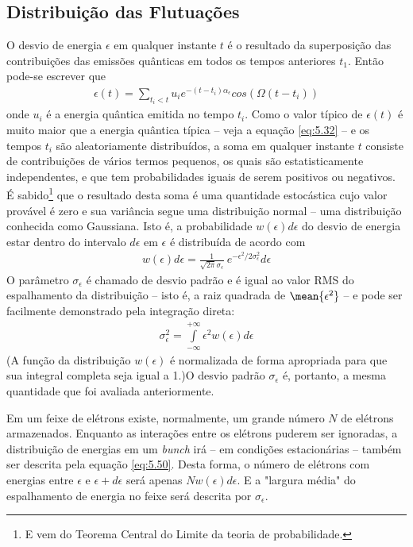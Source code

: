 \subsection{Distribuição das Flutuações}
O desvio de energia $\epsilon$ em qualquer instante $t$ é o resultado da superposição das contribuições das emissões quânticas em todos os tempos anteriores $t_1$. Então pode-se escrever que
\begin{align}
	\epsilon(t) = \sum\limits_{t_i<t}^{}u_i e^{-(t-t_i)\alpha_\epsilon}cos(\Omega(t-t_i))\label{eq:5.49}
\end{align}
onde $u_i$ é a energia quântica emitida no tempo $t_i$. Como o valor típico de $\epsilon(t)$ é muito maior que a energia quântica típica -- veja a equação \eqref{eq:5.32} -- e os tempos $t_i$ são aleatoriamente distribuídos, a soma em qualquer instante $t$ consiste de contribuições de vários termos pequenos, os quais são estatisticamente independentes, e que tem probabilidades iguais de serem positivos ou negativos. É sabido\footnote{E vem do Teorema Central do Limite da teoria de probabilidade.} que o resultado desta soma é uma quantidade estocástica cujo valor provável é zero e sua variância segue uma distribuição normal -- uma distribuição conhecida como Gaussiana. Isto é, a probabilidade $w(\epsilon)d\epsilon$ do desvio de energia estar dentro do intervalo $d\epsilon$ em $\epsilon$ é distribuída de acordo com
\begin{align}
	w(\epsilon)d\epsilon = \frac{1}{\sqrt{2\pi}\sigma_\epsilon}\ e^{-\epsilon^2/2\sigma_\epsilon^2}d\epsilon\label{eq:5.50}
\end{align}
O parâmetro $\sigma_\epsilon$ é chamado de desvio padrão e é igual ao valor RMS do espalhamento da distribuição -- isto é, a raiz quadrada de $\mean{\epsilon^2}$ -- e pode ser facilmente demonstrado pela integração direta:
\begin{align}
	\sigma_\epsilon^2 = \int\limits_{-\infty}^{+\infty}\epsilon^2w(\epsilon)d\epsilon
\end{align}
(A função da distribuição $w(\epsilon)$ é normalizada de forma apropriada para que sua integral completa seja igual a 1.)O desvio padrão $\sigma_\epsilon$ é, portanto, a mesma quantidade que foi avaliada anteriormente.

Em um feixe de elétrons existe, normalmente, um grande número $N$ de elétrons armazenados. Enquanto as interações entre os elétrons puderem ser ignoradas, a distribuição de energias em um \textit{bunch} irá -- em condições estacionárias -- também ser descrita pela equação \eqref{eq:5.50}. Desta forma, o número de elétrons com energias entre $\epsilon$ e $\epsilon + d\epsilon$ será apenas $Nw(\epsilon)d\epsilon$. E a "largura média" do espalhamento de energia no feixe será descrita por $\sigma_\epsilon$.

